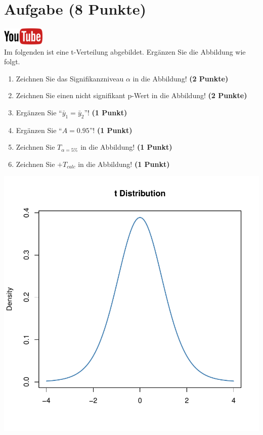 \documentclass[a4paper, 10pt]{scrartcl}\usepackage[]{graphicx}\usepackage[]{xcolor}
\makeatletter
\def\maxwidth{ %
  \ifdim\Gin@nat@width>\linewidth
    \linewidth
  \else
    \Gin@nat@width
  \fi
}
\makeatother
\begin{document}
 
\clearpage

\section{Aufgabe \hfill (8 Punkte)}

\hfill\href{https://youtu.be/32JjH1eyuTU}{\includegraphics[width =
  2cm]{img/youtube}}\\[1Ex]



Im folgenden ist eine t-Verteilung abgebildet. Erg{\"a}nzen Sie die Abbildung wie folgt.

\begin{enumerate}
\item Zeichnen Sie das Signifikanzniveau $\alpha$ in die Abbildung! \textbf{(2 Punkte)} 
\item Zeichnen Sie einen nicht signifikant p-Wert in die Abbildung! \textbf{(2 Punkte)} 
\item Erg{\"a}nzen Sie "`$\bar{y}_1 = \bar{y}_2$"'! \textbf{(1 Punkt)} 
\item Erg{\"a}nzen Sie "`$A = 0.95$"'! \textbf{(1 Punkt)}
\item Zeichnen Sie $T_{\alpha=5\%}$ in die Abbildung! \textbf{(1 Punkt)} 
\item Zeichnen Sie $+T_{calc}$ in die Abbildung! \textbf{(1 Punkt)} 
\end{enumerate}



{\centering \includegraphics[width=\maxwidth]{img/statistisches-testen-3-1} 

}
\end{document}
